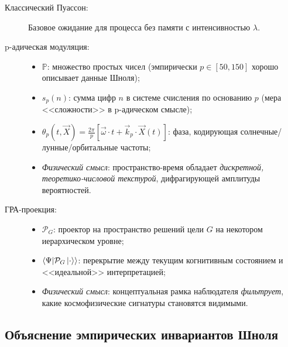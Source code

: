 \documentclass[12pt,a4paper]{article}
\theoremstyle{plain}
\theoremstyle{definition}
\theoremstyle{remark}
\newcommand{\bbP}{\mathbb{P}}
\newcommand{\cP}{\mathcal{P}}
\newcommand{\vX}{\vec{X}}
\newcommand{\vomega}{\vec{\omega}}
\newcommand{\vk}{\vec{k}}
\newcommand{\inner}[2]{\left\langle #1 \middle| #2 \right\rangle}
\begin{document}
\begin{description}
    \item[Классический Пуассон:] Базовое ожидание для процесса без памяти с интенсивностью $\lambda$.
    
    \item[p-адическая модуляция:]
    \begin{itemize}
        \item $\bbP$: множество простых чисел (эмпирически $p \in [50, 150]$ хорошо описывает данные Шноля);
        \item $s_p(n)$: сумма цифр $n$ в системе счисления по основанию $p$ (мера <<сложности>> в p-адическом смысле);
        \item $\theta_p(t, \vX) = \frac{2\pi}{p} \left[ \vomega \cdot t + \vk_p \cdot \vX(t) \right]$: фаза, кодирующая солнечные/лунные/орбитальные частоты;
        \item \emph{Физический смысл}: пространство-время обладает \emph{дискретной, теоретико-числовой текстурой}, дифрагирующей амплитуды вероятностей.
    \end{itemize}
    
    \item[ГРА-проекция:]
    \begin{itemize}
        \item $\cP_{G}$: проектор на пространство решений цели $G$ на некотором иерархическом уровне;
        \item $\inner{\Psi}{\cP_{G} \ket{\cdot}}$: перекрытие между текущим когнитивным состоянием и <<идеальной>> интерпретацией;
        \item \emph{Физический смысл}: концептуальная рамка наблюдателя \emph{фильтрует}, какие космофизические сигнатуры становятся видимыми.
    \end{itemize}
\end{description}

\subsection{Объяснение эмпирических инвариантов Шноля}
\end{document}

